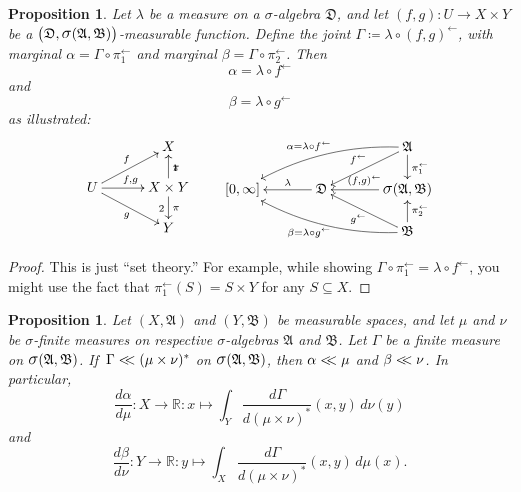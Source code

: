\documentclass[
twoside=true,
paper=letter,
fontsize=11pt,
pagesize=auto,
leqno,
openany,
headsepline,
overfullrule,
]{scrbook}
\theoremstyle{plain}
\theoremstyle{plain}
\newtheorem{prop}[thm]{Proposition}
\theoremstyle{definition}
\theoremstyle{bfnoteitalic}
\theoremstyle{bfnoteroman}
\newcommand{\sigalg}[1]{\mathfrak{#1}}
\newcommand{\definedby}{\coloneqq}
\newcommand{\sagb}{\mathop{\hbox{\large{$\sigma$}}}\nolimits}
\newcommand{\textsigma}{\hbox{\large{$\sigma$}}\kern-1pt}
\newcommand{\preimage}[1]{#1^{\leftarrow}}
\newcommand{\R}{\mathbb{R}}
\newcommand{\sigmaalgebra}{\sigalg{A}}
\newcommand{\sigmaalgebraii}{\sigalg{B}}
\newcommand{\productsig}[2]{\sagb(#1,#2)}
\newcommand{\funcf}{f}
\newcommand{\funcg}{g}
\newcommand{\measurespace}{X}
\newcommand{\measurespaceii}{Y}
\newcommand{\mspaceelt}{x}
\newcommand{\mspaceeltii}{y}
\newcommand{\abscont}{\mathrel{< \kern-3.5pt <}}
\newcommand{\measure}{\mu}
\newcommand{\measmu}{\mu}
\newcommand{\measureii}{\nu}
\newcommand{\measnu}{\nu}
\newcommand{\measlambda}{\lambda}
\newcommand{\projectionone}{\pi_1}
\newcommand{\projectiontwo}{\pi_2}
\newcommand{\uspace}{U}%
\newcommand{\uspacesig}{\sigalg{D}}
\newcommand{\joint}{\Gamma}%
\newcommand{\measonprod}{\Gamma}%
\newcommand{\marginalone}{\alpha}%
\newcommand{\marginaltwo}{\beta}%
\begin{document}
\begin{prop}\label{induced_marginals}
Let $\measlambda$ be a measure on a \textsigma-algebra
$\uspacesig$,
and let
$(\funcf,\funcg):\uspace\to \measurespace  \times \measurespaceii $
be a
$\bigl(\uspacesig,\productsig{\sigmaalgebra}{\sigmaalgebraii}\bigr)$\hyp{}measurable
function.
Define the joint
$\measonprod 
\definedby
\measlambda\circ\preimage{(\funcf,\funcg)}$,
with marginal
$\marginalone
=
\measonprod\circ\preimage{\projectionone}$
and marginal
$\marginaltwo
=
\measonprod\circ\preimage{\projectiontwo}$.
Then
\[
\marginalone
= 
\measlambda\circ\preimage{\funcf}
\]
and
\[
\marginaltwo
=
\measlambda\circ\preimage{\funcg}
\]
as illustrated:
\[
\xymatrix@R=16pt@C=30pt{ 
 & \measurespace
 \\
 \uspace 
 \ar[ur]^{\funcf}
 \ar[dr]_{\funcg}
 \ar[r]^{\funcf, \funcg} &
 \measurespace \times \measurespaceii  \ar[u]_\projectionone \ar[d]^\projectiontwo
 \\
 & \measurespaceii  \\
}
\qquad
\xymatrix@R=16pt@C=34pt{ 
 & & \sigmaalgebra
 \ar[dl]_{\preimage{\funcf}}
 \ar[d]^{\preimage{\projectionone}}
 \ar@/_10pt/[lld]_{\makebox[0pt][r]{$\scriptstyle{\marginalone} = $}\measlambda\circ\preimage{\funcf}}
 \\
 [0,\infty] & \uspacesig \ar[l]_-{\measlambda} & 
 \productsig{\sigmaalgebra}{\sigmaalgebraii} 
 \ar[l]_{\preimage{(\funcf,\funcg)}}
 \\
 & & \sigmaalgebraii
  \ar[u]_{\preimage{\projectiontwo}}
  \ar[ul]^{\preimage{\funcg}}
  \ar@/^10pt/[llu]^{\makebox[0pt][r]{$\scriptstyle{\marginaltwo} = $}\measlambda\circ\preimage{\funcg}}
  \\
}
\]
\end{prop}

\begin{proof}
This is just ``set theory.''  For example, while showing
$\measonprod \circ \preimage{\projectionone}
=
\measlambda\circ\preimage{\funcf}$,
you might use the fact that 
$\preimage{\projectionone}(S) = S\times \measurespaceii $ for any $S\subseteq \measurespace $.
\end{proof}




\begin{prop}\label{marginal_abscont}
Let 
$(\measurespace, \sigmaalgebra)$
and
$(\measurespaceii, \sigmaalgebraii)$
be measurable spaces, and let $\measure$ and $\measureii$
be \textsigma-finite measures on respective \textsigma-algebras 
$\sigmaalgebra$ and $\sigmaalgebraii$.
Let $\measonprod$ be a finite measure on 
$\productsig{\sigmaalgebra}{\sigmaalgebraii}$. 
If $\,\measonprod \abscont (\measure\times\measureii)^*$ on
$\productsig{\sigmaalgebra}{\sigmaalgebraii}$, 
then 
$\marginalone\abscont\measure$
and
$\marginaltwo\abscont\measureii$.
In particular,
\[
\frac{d \marginalone}
{d\measure}
: \measurespace\to\R :
\mspaceelt\mapsto
\int_{\measurespaceii}
\frac{d\joint}{d(\measmu\times\measnu)^*}
(\mspaceelt,\mspaceeltii)
\,d\measureii(\mspaceeltii)
\]
and
\[
\frac{d \marginaltwo}
{d\measureii}
: \measurespaceii\to\R :
\mspaceeltii\mapsto
\int_{\measurespace}
\frac{d\joint}{d(\measmu\times\measnu)^*}
(\mspaceelt,\mspaceeltii)\,d\measure(\mspaceelt).
\]
\end{prop}
\end{document}
